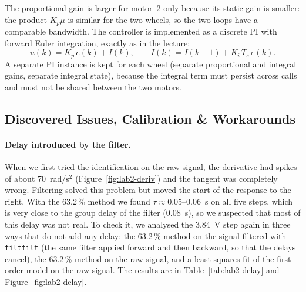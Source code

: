 \documentclass[english]{article}
\begin{document}
\noindent The proportional gain is larger for motor~2 only because its static gain is smaller: the product
$K_p\mu$ is similar for the two wheels, so the two loops have a comparable bandwidth. The controller is implemented
as a discrete PI with forward Euler integration, exactly as in the lecture:
\begin{equation}
  u(k) = K_p\,e(k) + I(k), \qquad I(k) = I(k-1) + K_i\,T_s\,e(k) .
  \label{eq:lab2-pi}
\end{equation}
A separate PI instance is kept for each wheel (separate proportional and integral gains, separate integral state),
because the integral term must persist across calls and must not be shared between the two motors.

\subsection{Discovered Issues, Calibration \& Workarounds}
\label{sec:lab2-issues}

\paragraph{Delay introduced by the filter.} When we first tried the identification on the raw signal, the
derivative had spikes of about 70~rad/s$^2$ (Figure~\ref{fig:lab2-deriv}) and the tangent was completely wrong.
Filtering solved this problem but moved the start of the response to the right. With the 63.2\,\% method we found
$\tau\approx0.05$--$0.06$~s on all five steps, which is very close to the group delay of the filter (0.08~s), so we
suspected that most of this delay was not real. To check it, we analysed the 3.84~V step again in three ways that do
not add any delay: the 63.2\,\% method on the signal filtered with \texttt{filtfilt} (the same filter applied
forward and then backward, so that the delays cancel), the 63.2\,\% method on the raw signal, and a least-squares fit
of the first-order model on the raw signal. The results are in Table~\ref{tab:lab2-delay} and
Figure~\ref{fig:lab2-delay}.
\end{document}
